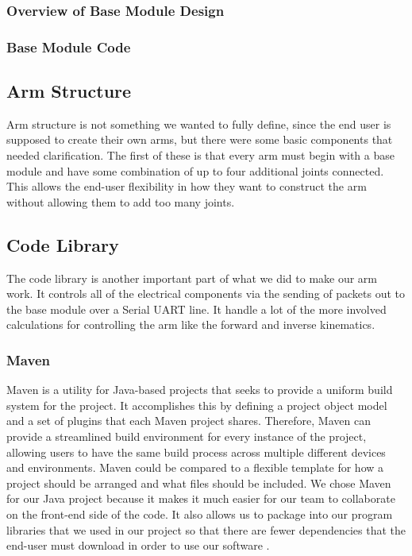 \subsubsection{Overview of Base Module Design}
\subsubsection{Base Module Code}

\subsection{Arm Structure}
Arm structure is not something we wanted to fully define, since the end user is supposed to create their own arms, but there were some basic components that needed clarification. The first of these is that every arm must begin with a base module and have some combination of up to four additional joints connected.  This allows the end-user flexibility in how they want to construct the arm without allowing them to add too many joints.


\subsection{Code Library}
The code library is another important part of what we did to make our arm work. It controls all of the electrical components via the sending of packets out to the base module over a Serial UART line. It handle a lot of the more involved calculations for controlling the arm like the forward and inverse kinematics.  


\subsubsection{Maven}
Maven is a utility for Java-based projects that seeks to provide a uniform build system for the project. It accomplishes this by defining a project object model and a set of plugins that each Maven project shares. Therefore, Maven can provide a streamlined build environment for every instance of the project, allowing users to have the same build process across multiple different devices and environments. Maven could be compared to a flexible template for how a project should be arranged and what files should be included. We chose Maven for our Java project because it makes it much easier for our team to collaborate on the front-end side of the code.  It also allows us to package into our program libraries that we used in our project so that there are fewer dependencies that the end-user must download in order to use our software \cite{maven}.


